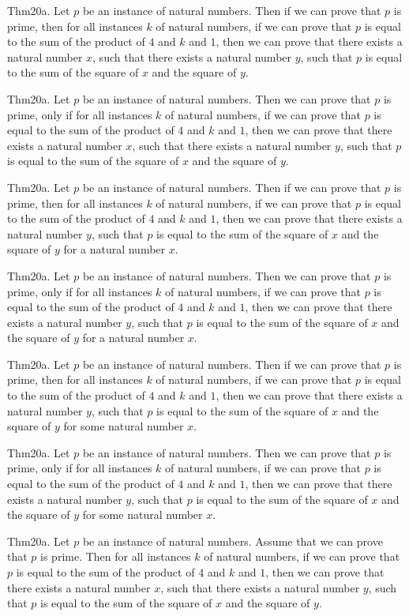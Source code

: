 \documentclass{article}
\begin{document}
Thm20a. Let $p$ be an instance of natural numbers. Then if we can prove that $p$ is prime, then for all instances $k$ of natural numbers, if we can prove that $p$ is equal to the sum of the product of $4$ and $k$ and $1$, then we can prove that there exists a natural number $x$, such that there exists a natural number $y$, such that $p$ is equal to the sum of the square of $x$ and the square of $y$.

Thm20a. Let $p$ be an instance of natural numbers. Then we can prove that $p$ is prime, only if for all instances $k$ of natural numbers, if we can prove that $p$ is equal to the sum of the product of $4$ and $k$ and $1$, then we can prove that there exists a natural number $x$, such that there exists a natural number $y$, such that $p$ is equal to the sum of the square of $x$ and the square of $y$.

Thm20a. Let $p$ be an instance of natural numbers. Then if we can prove that $p$ is prime, then for all instances $k$ of natural numbers, if we can prove that $p$ is equal to the sum of the product of $4$ and $k$ and $1$, then we can prove that there exists a natural number $y$, such that $p$ is equal to the sum of the square of $x$ and the square of $y$ for a natural number $x$.

Thm20a. Let $p$ be an instance of natural numbers. Then we can prove that $p$ is prime, only if for all instances $k$ of natural numbers, if we can prove that $p$ is equal to the sum of the product of $4$ and $k$ and $1$, then we can prove that there exists a natural number $y$, such that $p$ is equal to the sum of the square of $x$ and the square of $y$ for a natural number $x$.

Thm20a. Let $p$ be an instance of natural numbers. Then if we can prove that $p$ is prime, then for all instances $k$ of natural numbers, if we can prove that $p$ is equal to the sum of the product of $4$ and $k$ and $1$, then we can prove that there exists a natural number $y$, such that $p$ is equal to the sum of the square of $x$ and the square of $y$ for some natural number $x$.

Thm20a. Let $p$ be an instance of natural numbers. Then we can prove that $p$ is prime, only if for all instances $k$ of natural numbers, if we can prove that $p$ is equal to the sum of the product of $4$ and $k$ and $1$, then we can prove that there exists a natural number $y$, such that $p$ is equal to the sum of the square of $x$ and the square of $y$ for some natural number $x$.

Thm20a. Let $p$ be an instance of natural numbers. Assume that we can prove that $p$ is prime. Then for all instances $k$ of natural numbers, if we can prove that $p$ is equal to the sum of the product of $4$ and $k$ and $1$, then we can prove that there exists a natural number $x$, such that there exists a natural number $y$, such that $p$ is equal to the sum of the square of $x$ and the square of $y$.
\end{document}
